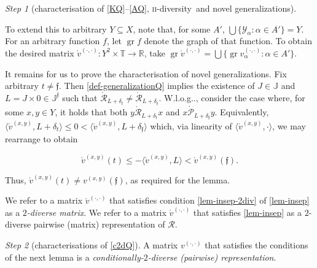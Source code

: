 \documentclass[ecta,nameyear,draft]{econsocart}
\makeatletter
\newcommand{\R}{\mathbb R}
\newcommand{\mc}{\mathcal}
\newcommand{\novel}{\mathfrak f}
\newcommand{\ext}{\mathrel{\mc R}}
\newcommand{\aext}{\mathrel{\acute{\mathrel{\mathcal R}}}}
\newcommand{\asext}{\mathrel{\acute{\mathrel{\mathcal P}}}}
\newcommand{\aextb}{\mathbin{\acute{\mathbin{\mathcal R}}}}
\newcommand{\mbbt}{{\mathds {T}}}
\newcommand{\mbbj}{\mathds J}
\newcommand{\mbbjp}{{\mathds {J}^{\novel}}}
\newcommand{\xy}{{(x, y)}}
\newcommand{\dd}{{(\cdot,\cdot)}}
\newcommand{\twodiv}{\textsc{ii}-\textup{diversity}}
\DeclareMathOperator{\graph}{gr}
\newcommand\Wlog{W\@.l\@.o\@.g\@ifnextchar.{}{.\@}}
\theoremstyle{plain}
\theoremstyle{remark}
\newtheorem{step}{Step}[section]
\makeatother
\begin{document}
\begin{appendix}
\begin{step}[characterisation of \ref{KQ}–\ref{AQ}, \twodiv\ and novel
      generalizations]
\begin{proofEnd}
      To extend this to arbitrary $Y \subseteq X$, note that, for some $A'$,
      $\bigcup\{\mc Y_\alpha : \alpha \in A' \} = Y$. For an arbitrary function
      $f$, let $\graph f$ denote the graph of that function. To obtain the
      desired matrix $\acute{v}^{\dd}: Y^2 \times \mbbt \rightarrow \R$, take
      $\graph \acute{v}^{\dd} = \bigcup \{\graph v^{\dd}_{\alpha} : \alpha \in
      A'\}$.
    
      It remains for us to prove the characterisation of novel
      generalizations. Fix arbitrary $t \neq \novel$.  Then
      \cref{def-generalizationQ} implies the existence of $J \in \mbbj$ and $L
      = J \times 0 \in \mbbjp$ such that $\aextb _ {L + \delta_{t}} \neq \aextb
      _ {L + \delta_{\novel}}$.  \Wlog, consider the case where, for some $x ,
      y \in Y$, it holds that both $y \aext _ {L + \delta _ t} x$ and $x \asext
      _ {L + \delta_ \novel} y $. Equivalently, $\langle \acute{v}^{\xy}, L +
      \delta_ t \rangle \leq 0 < \langle \acute{v}^{\xy}, L + \delta_
      \novel\rangle$ which, via linearity of $\langle \acute{v}^{\xy}, \cdot
      \rangle$, we may rearrange to obtain
      \begin{linenomath*}
        \begin{equation}\label{eq-nov} \acute{v}^{\xy} ( t ) \leq -\langle
          \acute{v}^{\xy}, L \rangle <
          \acute{v}^\xy ( \novel ) .
        \end{equation}
      \end{linenomath*}
      Thus, $\acute{v}^{\xy} (t) \neq v^{\xy}(\novel)$, as required for the
      lemma.
    \end{proofEnd}
    We refer to a matrix $\acute{v}^{\dd}$ that satisfies condition
    \ref{lem-insep-2div} of \cref{lem-insep} as a \emph{$2$-diverse matrix}. We
    refer to a matrix $\acute{v}^{\dd}$ that satisfies \cref{lem-insep} as a
    $2$-diverse pairwise (matrix) representation of $\ext$.
  \end{step}
  \begin{step}[characterisations of \ref{c2dQ}]\label{step-ref{c2d}} A matrix
    $v^{\dd}$ that satisfies the conditions of the next lemma is a
    \emph{conditionally-$2$-diverse (pairwise) representation}.
  

\end{step}
\end{appendix}
\end{document}
